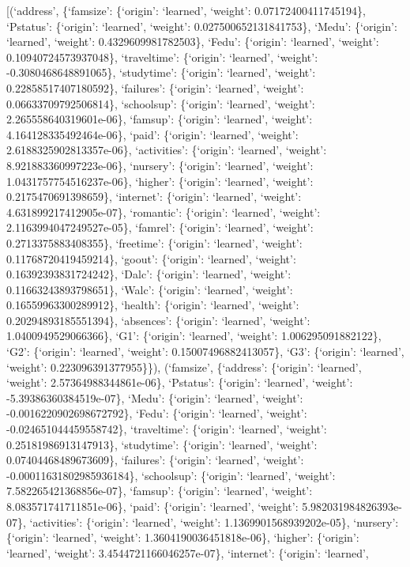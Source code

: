 \documentclass[
]{article}
\begin{document}
{[}(`address', \{`famsize': \{`origin': `learned', `weight':
0.07172400411745194\}, `Pstatus': \{`origin': `learned', `weight':
0.027500652131841753\}, `Medu': \{`origin': `learned', `weight':
0.4329609981782503\}, `Fedu': \{`origin': `learned', `weight':
0.10940724573937048\}, `traveltime': \{`origin': `learned', `weight':
-0.3080468648891065\}, `studytime': \{`origin': `learned', `weight':
0.22858517407180592\}, `failures': \{`origin': `learned', `weight':
0.06633709792506814\}, `schoolsup': \{`origin': `learned', `weight':
2.265558640319601e-06\}, `famsup': \{`origin': `learned', `weight':
4.164128335492464e-06\}, `paid': \{`origin': `learned', `weight':
2.6188325902813357e-06\}, `activities': \{`origin': `learned', `weight':
8.921883360997223e-06\}, `nursery': \{`origin': `learned', `weight':
1.0431757754516237e-06\}, `higher': \{`origin': `learned', `weight':
0.2175470691398659\}, `internet': \{`origin': `learned', `weight':
4.631899217412905e-07\}, `romantic': \{`origin': `learned', `weight':
2.1163994047249527e-05\}, `famrel': \{`origin': `learned', `weight':
0.2713375883408355\}, `freetime': \{`origin': `learned', `weight':
0.11768720419459214\}, `goout': \{`origin': `learned', `weight':
0.16392393831724242\}, `Dalc': \{`origin': `learned', `weight':
0.11663243893798651\}, `Walc': \{`origin': `learned', `weight':
0.16559963300289912\}, `health': \{`origin': `learned', `weight':
0.20294893185551394\}, `absences': \{`origin': `learned', `weight':
1.0400949529066366\}, `G1': \{`origin': `learned', `weight':
1.006295091882122\}, `G2': \{`origin': `learned', `weight':
0.15007496882413057\}, `G3': \{`origin': `learned', `weight':
0.223096391377955\}\}), (`famsize', \{`address': \{`origin': `learned',
`weight': 2.57364988344861e-06\}, `Pstatus': \{`origin': `learned',
`weight': -5.39386360384519e-07\}, `Medu': \{`origin': `learned',
`weight': -0.0016220902698672792\}, `Fedu': \{`origin': `learned',
`weight': -0.024651044459558742\}, `traveltime': \{`origin': `learned',
`weight': 0.25181986913147913\}, `studytime': \{`origin': `learned',
`weight': 0.07404468489673609\}, `failures': \{`origin': `learned',
`weight': -0.00011631802985936184\}, `schoolsup': \{`origin': `learned',
`weight': 7.582265421368856e-07\}, `famsup': \{`origin': `learned',
`weight': 8.083571741711851e-06\}, `paid': \{`origin': `learned',
`weight': 5.982031984826393e-07\}, `activities': \{`origin': `learned',
`weight': 1.1369901568939202e-05\}, `nursery': \{`origin': `learned',
`weight': 1.3604190036451818e-06\}, `higher': \{`origin': `learned',
`weight': 3.4544721166046257e-07\}, `internet': \{`origin': `learned',
\end{document}
